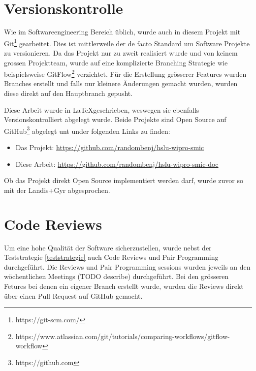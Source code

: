 \section{Versionskontrolle}

Wie im Softwareengineering Bereich üblich, wurde auch in diesem Projekt mit Git\footnote{https://git-scm.com/}
gearbeitet. Dies ist mittlerweile der de facto Standard um Software Projekte zu versionieren. \parencite{git}
Da das Projekt nur zu zweit realisiert wurde und von keinem grossen Projektteam, wurde auf
eine komplizierte Branching Strategie wie beispielsweise
GitFlow\footnote{https://www.atlassian.com/git/tutorials/comparing-workflows/gitflow-workflow} verzichtet.
Für die Erstellung grösserer Features wurden Branches erstellt und falls nur kleinere
Änderungen gemacht wurden, wurden diese direkt auf den Hauptbranch gepusht.

Diese Arbeit wurde in \LaTeX geschrieben, weswegen sie ebenfalls Versionskontrolliert abgelegt wurde.
Beide Projekte sind Open Source auf GitHub\footnote{https://github.com} abgelegt unt under
folgenden Links zu finden:

\begin{itemize}
  \item Das Projekt: \url{https://github.com/randombenj/hslu-wipro-smic}
  \item Diese Arbeit: \url{https://github.com/randombenj/hslu-wipro-smic-doc}
\end{itemize}

Ob das Projekt direkt Open Source implementiert werden darf, wurde zuvor so mit der Landis+Gyr abgesprochen.

\section{Code Reviews}

Um eine hohe Qualität der Software sicherzustellen, wurde nebst der Teststrategie \ref{teststrategie}
auch Code Reviews und Pair Programming durchgeführt. \parencite{fu2017code}
Die Reviews und Pair Programming sessions wurden jeweils an den wöchentlichen
Meetings (TODO describe) durchgeführt.
Bei den grösseren Fetures bei denen ein eigener Branch erstellt wurde, wurden die
Reviews direkt über einen Pull Request auf GitHub gemacht. \parencite{github_flow_docs_2021}

